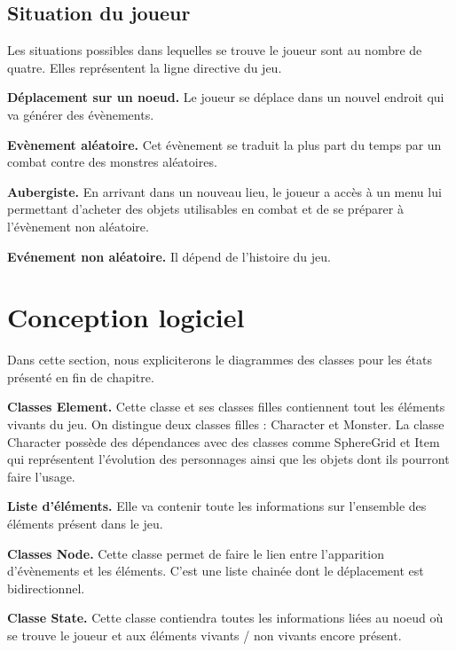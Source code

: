 \documentclass[12pt,a4paper]{report}
\begin{document}
\subsection{Situation du joueur}

Les situations possibles dans lequelles se trouve le joueur sont au nombre de quatre. Elles repr\'{e}sentent la ligne directive du jeu.

\textbf{D\'{e}placement sur un noeud.} Le joueur se d\'{e}place dans un nouvel endroit qui va g\'{e}n\'{e}rer des \'{e}v\`{e}nements. 

\textbf{Ev\`{e}nement al\'{e}atoire.} Cet \'{e}v\`{e}nement se traduit la plus part du temps par un combat contre des monstres al\'{e}atoires.

\textbf{Aubergiste.} En arrivant dans un nouveau lieu, le joueur a acc\`{e}s \`{a} un menu lui permettant d'acheter des objets utilisables en combat et de se pr\'{e}parer \`{a} l'\'{e}v\`{e}nement non al\'{e}atoire.

\textbf{Ev\'{e}nement non al\'{e}atoire.} Il d\'{e}pend de l'histoire du jeu.

\newpage

\section{Conception logiciel}

Dans cette section, nous expliciterons le diagrammes des classes pour les \'{e}tats pr\'{e}sent\'{e} en fin de chapitre. 

\textbf{Classes Element.} Cette classe et ses classes filles contiennent tout les \'{e}l\'{e}ments vivants du jeu. On distingue deux classes filles : Character et Monster. La classe Character poss\`{e}de des d\'{e}pendances avec des classes comme SphereGrid et Item qui repr\'{e}sentent l'\'{e}volution des personnages ainsi que les objets dont ils pourront faire l'usage. 

\textbf{Liste d'\'{e}l\'{e}ments.} Elle va contenir toute les informations sur l'ensemble des \'{e}l\'{e}ments pr\'{e}sent dans le jeu. 

\textbf{Classes Node.} Cette classe permet de faire le lien entre l'apparition d'\'{e}v\`{e}nements et les \'{e}l\'{e}ments. C'est une liste chain\'{e}e dont le d\'{e}placement est bidirectionnel. 

\textbf{Classe State.} Cette classe contiendra toutes les informations li\'{e}es au noeud o\`{u} se trouve le joueur et aux \'{e}l\'{e}ments vivants / non vivants encore pr\'{e}sent.
\end{document}

